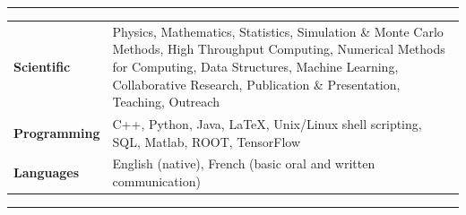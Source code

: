 \documentclass{letter}
\begin{document}
\begin{flushleft}
\Large{\textsc{\textbf{\color{Maroon}{Skills}}}}
\hrule
\end{flushleft}

\begin{tabular}{p{}p{}}
	{\bf Scientific} 
	&
	Physics, Mathematics, Statistics, Simulation \& Monte Carlo Methods, High Throughput Computing, Numerical Methods for Computing, Data Structures, Machine Learning, Collaborative Research, Publication \& Presentation, Teaching, Outreach \newline
\\
	{\bf Programming} 
	&
	C++, Python, Java, \LaTeX{}, Unix/Linux shell scripting, SQL, Matlab, ROOT, TensorFlow \newline
\\ 
	{\bf Languages}
	&
	English (native), French (basic oral and written communication)
\end{tabular}

\begin{flushleft}
\Large{\textsc{\textbf{\color{Maroon}{Volunteering \& Outreach}}}}
\hrule
\end{flushleft}
\end{document}
